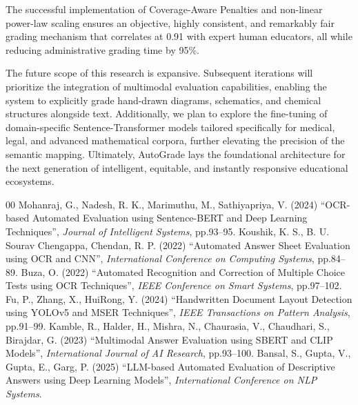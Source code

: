 \documentclass[conference]{IEEEtran}
\begin{document}
The successful implementation of Coverage-Aware Penalties and non-linear power-law scaling ensures an objective, highly consistent, and remarkably fair grading mechanism that correlates at 0.91 with expert human educators, all while reducing administrative grading time by 95\%.

The future scope of this research is expansive. Subsequent iterations will prioritize the integration of multimodal evaluation capabilities, enabling the system to explicitly grade hand-drawn diagrams, schematics, and chemical structures alongside text. Additionally, we plan to explore the fine-tuning of domain-specific Sentence-Transformer models tailored specifically for medical, legal, and advanced mathematical corpora, further elevating the precision of the semantic mapping. Ultimately, AutoGrade lays the foundational architecture for the next generation of intelligent, equitable, and instantly responsive educational ecosystems.

\begin{thebibliography}{00}
 Mohanraj, G., Nadesh, R. K., Marimuthu, M., Sathiyapriya, V. (2024) ``OCR-based Automated Evaluation using Sentence-BERT and Deep Learning Techniques'', \textit{Journal of Intelligent Systems}, pp.93--95.
 Koushik, K. S., B. U. Sourav Chengappa, Chendan, R. P. (2022) ``Automated Answer Sheet Evaluation using OCR and CNN'', \textit{International Conference on Computing Systems}, pp.84--89.
 Buza, O. (2022) ``Automated Recognition and Correction of Multiple Choice Tests using OCR Techniques'', \textit{IEEE Conference on Smart Systems}, pp.97--102.
 Fu, P., Zhang, X., HuiRong, Y. (2024) ``Handwritten Document Layout Detection using YOLOv5 and MSER Techniques'', \textit{IEEE Transactions on Pattern Analysis}, pp.91--99.
 Kamble, R., Halder, H., Mishra, N., Chaurasia, V., Chaudhari, S., Birajdar, G. (2023) ``Multimodal Answer Evaluation using SBERT and CLIP Models'', \textit{International Journal of AI Research}, pp.93--100.
 Bansal, S., Gupta, V., Gupta, E., Garg, P. (2025) ``LLM-based Automated Evaluation of Descriptive Answers using Deep Learning Models'', \textit{International Conference on NLP Systems}.
\end{thebibliography}
\end{document}
